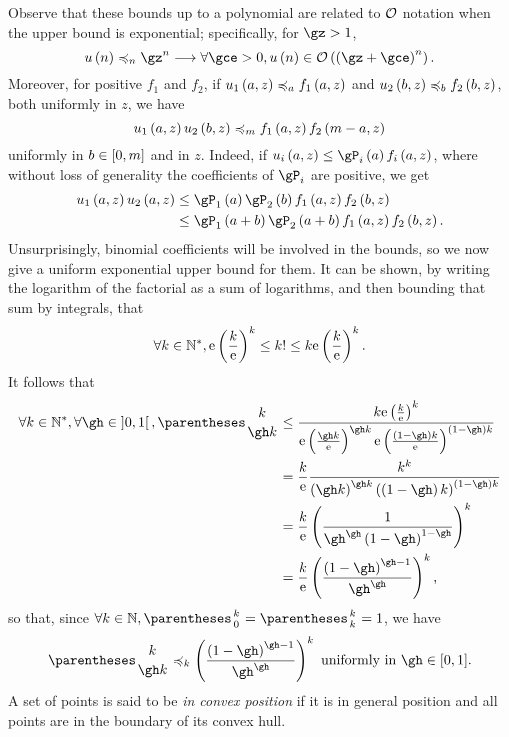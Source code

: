 Observe that these bounds up to a polynomial are related to $\mathcal{O}$ notation when the upper bound
is exponential; specifically, for $\gz>1$,
\[u \of n \preccurlyeq_n \gz^n \Implies \forall\gce>0, u\of n\in\BigO\of{\pa{\gz+\gce}^n}\text.\]
Moreover, for positive $f_1$ and $f_2$, if
$u_1\left(a,z\right)\preccurlyeq_a f_1\left(a,z\right)$ and
$u_2\left(b,z\right)\preccurlyeq_b f_2\left(b,z\right)$,
both uniformly in $z$, we have\[
u_1\left(a,z\right)u_2\left(b,z\right)\preccurlyeq_{m} f_1\left(a,z\right)f_2\left(m-a,z\right)
\]
uniformly in $b\in\left[0,m\right]$ and in $z$. Indeed, if $u_i\of{a,z}\leq \gP_i\of{a} f_i\of{a,z}$,
where without loss of generality the coefficients of $\gP_i$ are positive, we get
\begin{align*}u_1\of{a,z}u_2\of{a,z}
&\leq \gP_1\of{a}\gP_2\of{b} f_1\of{a,z}f_2\of{b,z}\\
&\leq \gP_1\of{a+b}\gP_2\of{a+b} f_1\of{a,z}f_2\of{b,z}\text.\end{align*}
Unsurprisingly, binomial coefficients will be involved in the bounds, so we now give a uniform exponential
upper bound for them.
It can be shown, by writing the logarithm of the factorial as a sum of logarithms,
and then bounding that sum by integrals, that\[
\forall k\in \mathbb{N}^*, \mathrm{e} \left(\frac{k}{\mathrm{e}}\right)^k \leq k! \leq k \mathrm{e} \left(\frac{k}{\mathrm{e}}\right)^k\text.
\]
It follows that\begin{align*}
\forall k\in \Positives, \forall \gh\in\intopen 0 1, \binom{k}{\gh k} &\leq
\frac{k \E \pa{\frac{k}{\E}}^k}{\E \pa{\frac{\gh k}{\E}}^{\gh k} \E \pa{\frac{\pa{1-\gh} k}{\E}}^{\pa{1-\gh}k}}\\
&=\frac{k}{\E} \frac{k^k}{\pa{\gh k}^{\gh k}\pa{\pa{1-\gh} k}^{\pa{1-\gh} k}} \\
&=\frac{k}{\E} \pa{\frac{1}{\gh^\gh\pa{1-\gh}^{1-\gh}}}^k \\
&=\frac{k}{\E} \pa{\frac{\pa{1-\gh}^{\gh-1}}{\gh^\gh}}^k\text,
\end{align*}
so that, since $\forall k\in \N, \binom k 0 = \binom k k = 1$, we have
\begin{equation}
\binom k {\gh k} \preccurlyeq_k \pa{\frac{\pa{1-\gh}^{\gh-1}}{\gh^\gh}}^k \text{ uniformly in $\gh\in\intclos 0 1$.}
\end{equation}
A set of points is said to be \emph{in convex position} if it is in general position and
all points are in the boundary of its convex hull.

